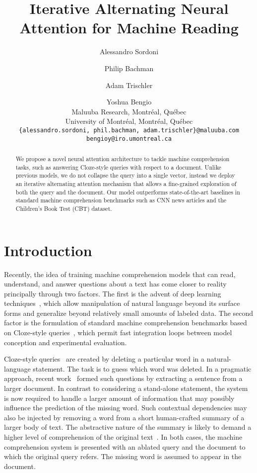\documentclass[11pt]{article}
\author{Alessandro Sordoni \and Philip Bachman \and Adam Trischler \and Yoshua Bengio \\
Maluuba Research, Montr\'eal, Qu\'ebec \\
University of Montr\'eal, Montr\'eal, Qu\'ebec \\
\small \tt \{alessandro.sordoni, phil.bachman, adam.trischler\}@maluuba.com \\
\small \tt bengioy@iro.umontreal.ca}
\title{Iterative Alternating Neural Attention for Machine Reading}
\begin{document}
\maketitle
\begin{abstract}
We propose a novel neural attention architecture to tackle machine comprehension tasks, such as answering Cloze-style queries with respect to a document. Unlike previous models, we do not collapse the query into a single vector, instead we deploy an iterative alternating attention mechanism that allows a fine-grained exploration of both the query and the document. Our model outperforms state-of-the-art baselines in standard machine comprehension benchmarks such as CNN news articles and the Children's Book Test (CBT) dataset.

\end{abstract}

\section{Introduction}








Recently, the idea of training machine comprehension models that can read, understand, and answer questions about a text has come closer to reality principally through two factors.  The first is the advent of deep learning techniques~\cite{bengio_book}, which allow manipulation of natural language beyond its surface forms and generalize beyond relatively small amounts of labeled data.  The second factor is the formulation of standard machine comprehension benchmarks based on Cloze-style queries~\cite{hill2015goldilocks,hermann2015teaching}, which permit fast integration loops between model conception and experimental evaluation.

Cloze-style queries~\cite{taylor1953} are created by deleting a particular word in a natural-language statement. The task is to guess which word was deleted. In a pragmatic approach, recent work~\cite{hill2015goldilocks} formed such questions by extracting a sentence from a larger document. In contrast to considering a stand-alone statement, the system is now required to handle a larger amount of information that may possibly influence the prediction of the missing word. Such contextual dependencies may also be injected by removing a word from a short human-crafted summary of a larger body of text. The abstractive nature of the summary is likely to demand a higher level of comprehension of the original text~\cite{hermann2015teaching}. In both cases, the machine comprehension system is presented with an ablated query and the document to which the original query refers. The missing word is assumed to appear in the document.
\end{document}
